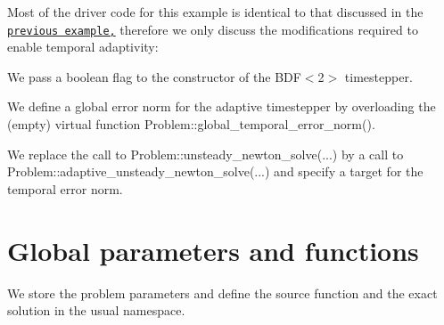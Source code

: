 Most of the driver code for this example is identical to that discussed in the \href{../../two_d_unsteady_heat/html/index.html}{\tt previous example,} therefore we only discuss the modifications required to enable temporal adaptivity\+:
\begin{DoxyItemize}
\item We pass a boolean flag to the constructor of the {\ttfamily B\+D\+F$<$2$>$} timestepper.
\item We define a global error norm for the adaptive timestepper by overloading the (empty) virtual function {\ttfamily Problem\+::global\+\_\+temporal\+\_\+error\+\_\+norm()}.
\item We replace the call to {\ttfamily Problem\+::unsteady\+\_\+newton\+\_\+solve}(...) by a call to {\ttfamily Problem\+::adaptive\+\_\+unsteady\+\_\+newton\+\_\+solve}(...) and specify a target for the temporal error norm.
\end{DoxyItemize}

 

\hypertarget{index_namespace}{}\section{Global parameters and functions}\label{index_namespace}
We store the problem parameters and define the source function and the exact solution in the usual namespace.

